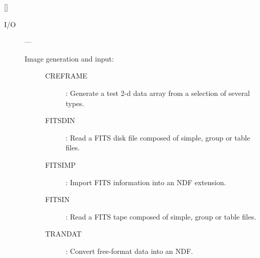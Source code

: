 \hfill []

\vspace{2mm}

\begin{description}

\item [I/O] ---
\begin{description}
\item [Image generation and input:]\hfill
\begin {description}
\item [CREFRAME]:
 Generate a test 2-d data array from a selection of several types.
\item [FITSDIN]:
 Read a FITS disk file composed of simple, group or table files.
\item [FITSIMP]:
 Import FITS information into an NDF extension.
\item [FITSIN]:
 Read a FITS tape composed of simple, group or table files.
\item [TRANDAT]:
 Convert free-format data into an NDF.
\end {description}
\end {description}


\end{description}
